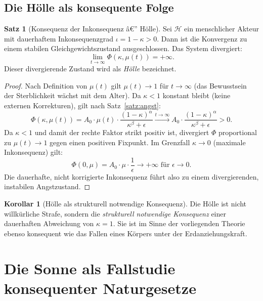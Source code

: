 ﻿\documentclass[a4paper,12pt]{article}
\theoremstyle{definition}
\newtheorem{satz}{Satz}
\newtheorem{korollar}{Korollar}
\begin{document}
\subsection{Die Hölle als konsequente Folge}

\begin{satz}[Konsequenz der Inkonsequenz â€” Hölle]
\label{satz:hoelle}
Sei $\mathcal{H}$ ein menschlicher Akteur mit dauerhaftem Inkonsequenzgrad $\iota = 1 - \kappa > 0$. Dann ist die Konvergenz zu einem stabilen Gleichgewichtszustand ausgeschlossen. Das System divergiert:
\[
\lim_{t \to \infty} \Phi(\kappa, \mu(t)) = +\infty.
\]
Dieser divergierende Zustand wird als \emph{Hölle} bezeichnet.
\end{satz}

\begin{proof}
Nach Definition von $\mu(t)$ gilt $\mu(t) \to 1$ für $t \to \infty$ (das Bewusstsein der Sterblichkeit wächst mit dem Alter). Da $\kappa < 1$ konstant bleibt (keine externen Korrekturen), gilt nach Satz~\ref{satz:angst}:
\[
\Phi(\kappa, \mu(t)) = A_0 \cdot \mu(t) \cdot \frac{(1-\kappa)^\alpha}{\kappa^\beta + \epsilon} \xrightarrow{t \to \infty} A_0 \cdot \frac{(1-\kappa)^\alpha}{\kappa^\beta + \epsilon} > 0.
\]
Da $\kappa < 1$ und damit der rechte Faktor strikt positiv ist, divergiert $\Phi$ proportional zu $\mu(t) \to 1$ gegen einen positiven Fixpunkt. Im Grenzfall $\kappa \to 0$ (maximale Inkonsequenz) gilt:
\[
\Phi(0, \mu) = A_0 \cdot \mu \cdot \frac{1}{\epsilon} \to +\infty \text{ für } \epsilon \to 0.
\]
Die dauerhafte, nicht korrigierte Inkonsequenz führt also zu einem divergierenden, instabilen Angstzustand. \qedhere
\end{proof}

\begin{korollar}[Hölle als strukturell notwendige Konsequenz]
Die Hölle ist nicht willkürliche Strafe, sondern die \emph{strukturell notwendige Konsequenz} einer dauerhaften Abweichung von $\kappa = 1$. Sie ist im Sinne der vorliegenden Theorie ebenso konsequent wie das Fallen eines Körpers unter der Erdanziehungskraft.
\end{korollar}

\section{Die Sonne als Fallstudie konsequenter Naturgesetze}
\end{document}
